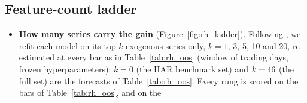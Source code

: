 \subsection{Feature-count ladder}
\label{app:rh_fi_ladder}

\begin{itemize}
\item \textbf{How many series carry the gain} (Figure~\ref{fig:rh_ladder}). Following
  \citet{MaischZhangUlrichZimmer2026}, we refit each model on its top $k$ exogenous series only, $k = 1$, 3, 5, 10
  and 20, re-estimated at every bar as in Table~\ref{tab:rh_oos} (window of \rhldEBWindowDays{} trading days, frozen
  hyperparameters); $k = 0$ (the HAR benchmark set) and $k = 46$ (the full set) are the forecasts of
  Table~\ref{tab:rh_oos}. Every rung is scored on the \rhldEBNBars{} bars of Table~\ref{tab:rh_oos}, and on the

\end{itemize}
